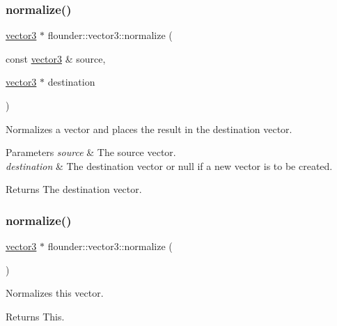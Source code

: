 \subsubsection{\texorpdfstring{normalize()}{normalize()}\hspace{0.1cm}{\footnotesize\ttfamily [1/2]}}
{\footnotesize\ttfamily \hyperlink{classflounder_1_1vector3}{vector3} $\ast$ flounder\+::vector3\+::normalize (\begin{DoxyParamCaption}\item[{const \hyperlink{classflounder_1_1vector3}{vector3} \&}]{source,  }\item[{\hyperlink{classflounder_1_1vector3}{vector3} $\ast$}]{destination }\end{DoxyParamCaption})\hspace{0.3cm}{\ttfamily [static]}}



Normalizes a vector and places the result in the destination vector. 


\begin{DoxyParams}{Parameters}
{\em source} & The source vector. \\
\hline
{\em destination} & The destination vector or null if a new vector is to be created. \\
\hline
\end{DoxyParams}
\begin{DoxyReturn}{Returns}
The destination vector. 
\end{DoxyReturn}
\mbox{\label{classflounder_1_1vector3_aabd9f495ffdbd3988227ca9b1bf5f794}} 
\subsubsection{\texorpdfstring{normalize()}{normalize()}\hspace{0.1cm}{\footnotesize\ttfamily [2/2]}}
{\footnotesize\ttfamily \hyperlink{classflounder_1_1vector3}{vector3} $\ast$ flounder\+::vector3\+::normalize (\begin{DoxyParamCaption}{ }\end{DoxyParamCaption})}



Normalizes this vector. 

\begin{DoxyReturn}{Returns}
This. 
\end{DoxyReturn}
\mbox{\label{classflounder_1_1vector3_a70876957cd503a2c1d3189906042d1ae}} 

